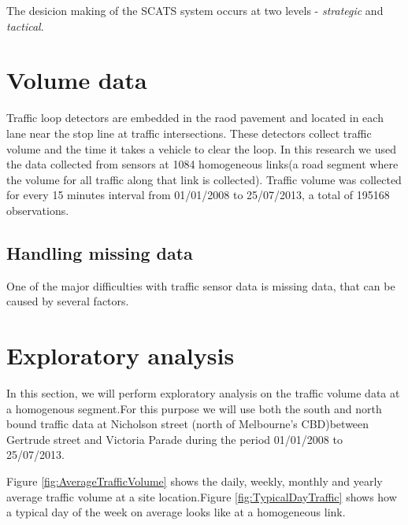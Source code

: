 The desicion making of the SCATS system occurs at two levels - \emph{strategic} and \emph{tactical}.


\section{Volume data}
Traffic loop detectors are embedded in the raod pavement and located in each lane near the stop
line at traffic intersections. These detectors collect traffic volume and the time it takes a
vehicle to clear the loop. In this research we used the data collected from sensors at 1084
homogeneous links(a road segment where the volume for all traffic along that link is collected).
Traffic volume was collected for every 15 minutes interval from 01/01/2008 to 25/07/2013, a total
of 195168 observations.


\subsection{Handling missing data}
One of the major difficulties with traffic sensor data is missing data, that can be caused by
several factors.

\section{Exploratory analysis}
In this section, we will perform exploratory analysis on the traffic volume data at a homogenous
segment.For this purpose we will use both the south and north bound traffic data at Nicholson
street (north of Melbourne's CBD)between Gertrude street and Victoria Parade  during the period
01/01/2008 to 25/07/2013.

Figure \ref{fig:AverageTrafficVolume} shows the daily, weekly, monthly and yearly average traffic
volume at a site location.Figure \ref{fig:TypicalDayTraffic} shows how a typical day of the week
on average looks like at a homogeneous link.

